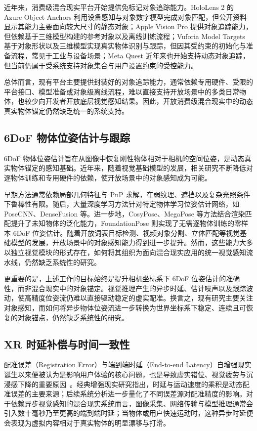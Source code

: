 \documentclass[9pt,twocolumn,letterpaper]{extarticle}
\begin{document}
近年来，消费级混合现实平台开始提供免标记对象追踪能力。HoloLens 2 的 Azure Object Anchors 利用设备感知与对象数字模型完成对象匹配，但公开资料显示其能力主要面向较大尺寸的静态对象；Apple Vision Pro 提供对象追踪能力，但依赖基于三维模型构建的参考对象以及离线训练流程；Vuforia Model Targets 基于对象形状以及三维模型实现真实物体识别与跟踪，但因其受约束的初始化与准备流程，常见于工业与设备场景；Meta Quest 近年来也开始支持动态对象追踪，但当前仍属于受系统支持对象集合与用户设置约束的受控能力。

总体而言，现有平台主要提供封装好的对象追踪能力，通常依赖专用硬件、受限的平台接口、模型准备或对象级离线流程，难以直接支持开放场景中的多类日常物体，也较少向开发者开放底层视觉感知结果。因此，开放消费级混合现实中的动态真实物体锚定仍然缺乏统一的系统支持。

\subsection{6DoF 物体位姿估计与跟踪}


6DoF 物体位姿估计旨在从图像中恢复刚性物体相对于相机的空间位姿，是动态真实物体锚定的感知基础。近年来，随着视觉基础模型的发展，相关研究不断降低对逐物体训练和专用硬件的依赖，使开放场景中的对象感知成为可能。

早期方法通常依赖局部几何特征与 PnP 求解，在弱纹理、遮挡以及复杂光照条件下鲁棒性有限。随后，大量深度学习方法针对特定物体学习位姿估计网络，如 PoseCNN、DenseFusion 等。进一步地，CosyPose、MegaPose 等方法结合渲染匹配提升了未知物体的泛化能力，FoundationPose 则实现了无需逐物体训练的零样本 6DoF 位姿估计。随着开放词表目标检测、视频对象分割、立体匹配等视觉基础模型的发展，开放场景中的对象感知能力得到进一步提升。然而，这些能力大多以独立视觉模块的形式存在，如何将其组织为面向混合现实应用的统一视觉感知流水线，仍然缺乏系统性的研究。

更重要的是，上述工作的目标始终是提升相机坐标系下 6DoF 位姿估计的准确性，而非混合现实中的对象锚定。视觉推理产生的异步时延、估计噪声以及跟踪波动，使高精度位姿流仍难以直接驱动稳定的虚实配准。换言之，现有研究主要关注对象感知，而如何将异步物体位姿流进一步转换为世界坐标系下稳定、连续且可恢复的对象锚点，仍然缺乏系统性的研究。

\subsection{XR 时延补偿与时间一致性}


配准误差（Registration Error）与端到端时延（End-to-end Latency）自增强现实诞生以来便被认为是影响用户体验的核心问题，也是导致虚实错位、视觉疲劳与沉浸感下降的重要原因~\cite{azuma1994improving,diluca2010latency}。经典增强现实研究指出，时延与运动速度的乘积是动态配准误差的主要来源；后续系统分析进一步量化了不同误差源对配准精度的影响。对于依赖异步视觉感知的混合现实系统而言，图像采集、网络传输与模型推理通常会引入数十毫秒乃至更高的端到端时延；当物体或用户快速运动时，这种异步时延便会表现为虚拟内容相对于真实物体的明显漂移与打滑。
\end{document}
